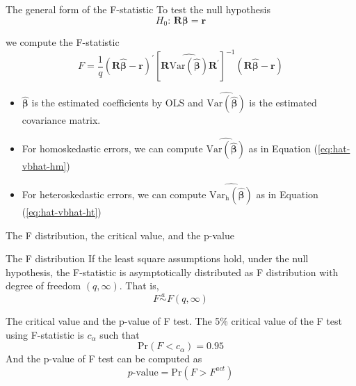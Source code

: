 \documentclass[presentation,10pt]{beamer}
\newcommand{\var}{\mathrm{Var}}
\newcommand{\pr}{\mathrm{Pr}}
\begin{document}
\begin{frame}[label={sec:org9b81d7c}]{The general form of the F-statistic}
To test the null hypothesis
\[ H_0:\, \mathbf{R}\boldsymbol{\beta} = \mathbf{r} \]

we compute the F-statistic
\begin{equation}
\label{eq:ftest-gen}
F = \frac{1}{q}(\mathbf{R}\hat{\boldsymbol{\beta}} - \mathbf{r})^{\prime} \left[ \mathbf{R} \widehat{\var(\hat{\boldsymbol{\beta}})} \mathbf{R}^{\prime} \right]^{-1} (\mathbf{R}\hat{\boldsymbol{\beta}} - \mathbf{r})
\end{equation}

\begin{itemize}
\item \(\hat{\boldsymbol{\beta}}\) is the estimated coefficients by OLS and
\(\widehat{\var(\hat{\boldsymbol{\beta}})}\) is the estimated covariance
matrix.
\item For homoskedastic errors, we can compute
\(\widehat{\var(\hat{\boldsymbol{\beta}})}\) as in Equation (\ref{eq:hat-vbhat-hm})
\item For heteroskedastic errors, we can compute
\(\widehat{\var_{\mathrm{h}}(\hat{\boldsymbol{\beta}})}\) as in
Equation (\ref{eq:hat-vbhat-ht})
\end{itemize}
\end{frame}

\begin{frame}[label={sec:org796f35f}]{The F distribution, the critical value, and the p-value}
\begin{block}{The F distribution}
If the least square assumptions hold, under the null hypothesis, the
F-statistic is asymptotically distributed as F distribution with
degree of freedom \((q, \infty)\). That is,
\[ F \overset{a}{\sim} F(q, \infty) \]
\end{block}

\begin{block}{The critical value and the p-value of F test.}
The 5\% critical value of the F test using F-statistic is \(c_{\alpha}\)
such that
\[\pr(F < c_{\alpha}) = 0.95\]
And the p-value of F test can be computed as
 \[ p\text{-value} = \pr(F > F^{act})\]
\end{block}
\end{frame}
\end{document}
